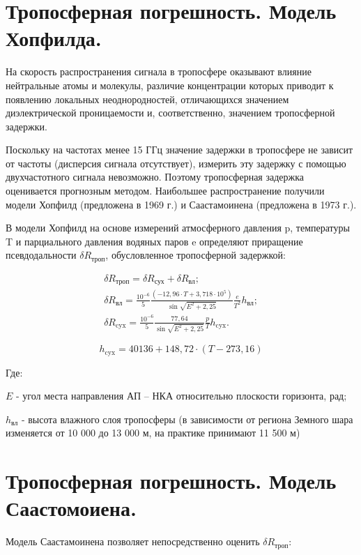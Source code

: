 \documentclass[14pt,a4paper,oneside]{extarticle}
\begin{document}
\section{Тропосферная погрешность. Модель Хопфилда.}

На скорость распространения сигнала в тропосфере оказывают влияние нейтральные атомы и молекулы, различие концентрации которых приводит к появлению локальных неоднородностей, отличающихся значением диэлектрической проницаемости и, соответственно, значением тропосферной задержки.

Поскольку на частотах менее 15 ГГц значение задержки в тропосфере не зависит от частоты (дисперсия сигнала отсутствует), измерить эту задержку с помощью двухчастотного сигнала невозможно. Поэтому тропосферная задержка оценивается прогнозным методом. Наибольшее распространение получили модели Хопфилд (предложена в 1969 г.) и Саастамоинена (предложена в 1973 г.).

В модели Хопфилд на основе измерений атмосферного давления p, температуры T и парциального давления водяных паров e определяют приращение псевдодальности $\delta R_{\text{троп}}$, обусловленное тропосферной задержкой:

\[\begin{gathered}
        \delta R_{\text{троп}}=\delta R_{\text{сух}}+\delta R_{\text{вл}}; \\
        {\delta}R_{\text{вл}}=\frac{10^{-6}}{5}\frac{(-12,96\cdot T+3,718\cdot10^{5})}{\sin\sqrt{E^{2}+2,25}}\frac{e}{T^{2}}h_{\text{вл}}; \\
        \delta R_{\text{cyx}}=\frac{10^{-6}}{5}\frac{77,64}{\sin\sqrt{E^{2}+2,25}}\frac{p}{T}h_{\text{cyx}}.
    \end{gathered}\]

    \[h_{\mathrm{cyx}}=40136+148,72\cdot(T-273,16)\]

Где:

$E$ - угол места направления АП – НКА относительно плоскости горизонта, рад;

$h_\text{вл}$ - высота влажного слоя тропосферы (в зависимости от региона Земного шара изменяется от 10 000 до 13 000 м, на практике принимают 11 500 м)

\section{Тропосферная погрешность. Модель Саастомоиена.}

Модель Саастамоинена позволяет непосредственно оценить $\delta R_{\text{троп}}$:
\end{document}
